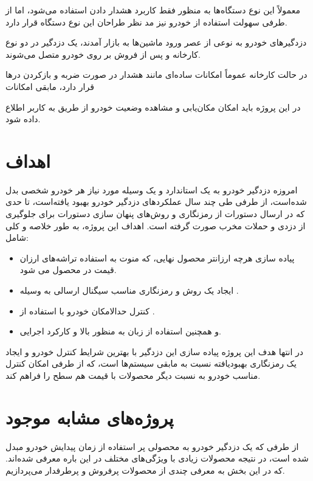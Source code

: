 \documentclass[a4paper,12pt]{report}
\begin{document}
	معمولاً این نوع دستگاه‌ها به منظور فقط کاربرد هشدار دادن استفاده می‌شود، اما از طرفی سهولت استفاده از خودرو نیز مد نظر طراحان این نوع دستگاه قرار دارد.

	دزدگیر‌های خودرو به نوعی از عصر ورود ماشین‌ها به بازار آمدند، یک دزدگیر در دو نوع کارخانه و پس از فروش بر روی خودرو متصل می‌شوند.

	در حالت کارخانه عموماً امکانات ساده‌ای مانند هشدار در صورت ضربه و بازکردن درها قرار دارد، مابقی امکانات

	در این پروژه باید امکان مکان‌یابی و مشاهده وضعیت خودرو از طریق
	به کاربر اطلاع داده شود.


	\section{
	اهداف
	}\label{sec2:chap1}
	امروزه دزدگیر خودرو به یک استاندارد و یک وسیله مورد نیاز هر خودرو شخصی بدل شده‌است،
	از طرفی طی چند سال عملکرد‌های دزدگیر خودرو بهبود یافته‌است،‌ تا حدی که در ارسال دستورات
	از رمزنگاری و روش‌های پنهان سازی دستورات برای جلوگیری از دزدی و حملات مخرب صورت گرفته است.
	اهداف این پروژه، به طور خلاصه و کلی شامل:
	\begin{itemize}[nosep]
		\item
		پیاده سازی هرچه ارزانتر محصول نهایی، که منوت به استفاده تراشه‌های ارزان قیمت در محصول می شود.
		\item
		ایجاد یک روش و رمزنگاری مناسب سیگنال ارسالی به وسیله
		.
		\item
		کنترل حدالامکان خودرو با استفاده از
		.
		\item
		و همچنین استفاده از زبان
		به منظور
		بالا و کارکرد اجرایی.
	\end{itemize}

		در انتها هدف این پروژه پیاده سازی این دزدگیر با بهترین شرایط کنترل خودرو و ایجاد یک رمزنگاری بهبودیافته نسبت به مابقی سیستم‌ها است، که از طرفی امکان کنترل مناسب خودرو به نسبت دیگر محصولات با قیمت هم سطح را فراهم کند.
	\section{
	پروژه‌های مشابه موجود
	}\label{sec3:chap1}
	از طرفی که یک دزدگیر خودرو به محصولی پر استفاده از زمان پیدایش خودرو مبدل شده است، در نتیجه محصولات زیادی با ویژگی‌های مختلف در این باره معرفی شده‌اند. که در این بخش به معرفی چندی از محصولات پرفروش و پرطرفدار می‌پردازیم.
\end{document}
